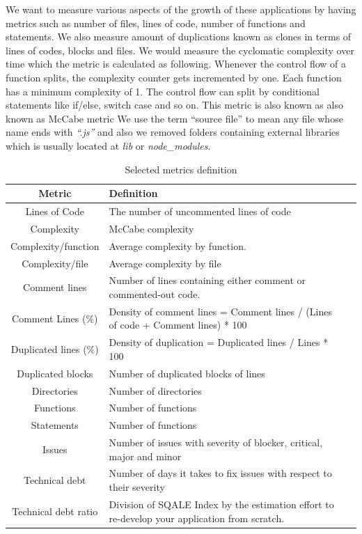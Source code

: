 We want to measure various aspects of the growth of these applications by having metrics such as number of files, lines of code, number of functions and statements. We also measure amount of duplications known as clones in terms of lines of codes, blocks and files. We would measure the cyclomatic complexity over time which the metric is calculated as following. Whenever the control flow of a function splits, the complexity counter gets incremented by one. Each function has a minimum complexity of 1. The control flow can split by conditional statements like if/else, switch case and so on. This metric is also known as also known as McCabe metric
We use the term “source file” to mean any file whose name ends with \textit{“.js”} and also we removed folders containing external libraries which is usually located at \textit{lib} or \textit{node\_modules}. 


\begin{table}[!hbt]
	\begin{center}
		\caption{Selected metrics definition}
		\label{tab:metrics_definition}
		\begin{tabular}{c| l l }
			\toprule
			
			\textbf{Metric} & \textbf{Definition} \\ \midrule
			Lines of Code & The number of uncommented lines of code    \\
			Complexity      & McCabe complexity    \\
			Complexity/function & Average complexity by function. \\
			Complexity/file & Average complexity by file \\
			Comment lines  & Number of lines containing either comment or commented-out code. \\
			Comment Lines (\%)   & Density of comment lines = Comment lines / (Lines of code + Comment lines) * 100    \\
			Duplicated lines (\%)     & Density of duplication = Duplicated lines / Lines * 100    \\
			Duplicated blocks   & Number of duplicated blocks of lines    \\
			Directories   & Number of directories    \\
			Functions            & Number of functions    \\
			Statements      & Number of functions   \\
			Issues    & Number of issues with severity of blocker, critical, major and minor   \\
			Technical debt    & Number of days it takes to fix issues with respect to their severity    \\
			Technical debt ratio   & Division of SQALE Index by the estimation effort to re-develop your application from scratch.    \\
		\end{tabular}
	\end{center}
\end{table}


